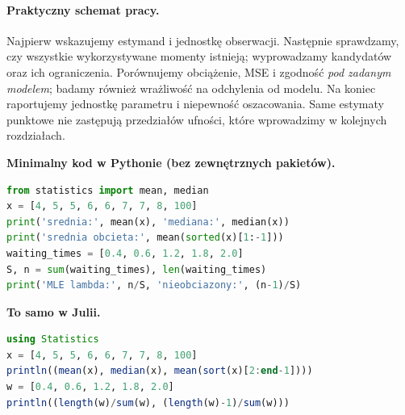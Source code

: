 \paragraph{Praktyczny schemat pracy.}
Najpierw wskazujemy estymand i jednostkę obserwacji. Następnie
sprawdzamy, czy wszystkie wykorzystywane momenty istnieją;
wyprowadzamy kandydatów oraz ich ograniczenia. Porównujemy obciążenie,
MSE i zgodność \emph{pod zadanym modelem}; badamy również wrażliwość
na odchylenia od modelu. Na koniec raportujemy jednostkę parametru
i niepewność oszacowania. Same estymaty punktowe nie zastępują
przedziałów ufności, które wprowadzimy w kolejnych rozdziałach.

\noindent\textbf{Minimalny kod w Pythonie (bez zewnętrznych pakietów).}\par
\par
{}
\smallskip
\begin{lstlisting}[language=Python,caption={Porównanie statystyk odpornych i estymatorów intensywności (Python).}]
from statistics import mean, median
x = [4, 5, 5, 6, 6, 7, 7, 8, 100]
print('srednia:', mean(x), 'mediana:', median(x))
print('srednia obcieta:', mean(sorted(x)[1:-1]))
waiting_times = [0.4, 0.6, 1.2, 1.8, 2.0]
S, n = sum(waiting_times), len(waiting_times)
print('MLE lambda:', n/S, 'nieobciazony:', (n-1)/S)
\end{lstlisting}
\noindent\textbf{To samo w Julii.}\par
\par
{}
\smallskip
\begin{lstlisting}[language=Julia,caption={Średnia obcięta i estymatory intensywności (Julia).}]
using Statistics
x = [4, 5, 5, 6, 6, 7, 7, 8, 100]
println((mean(x), median(x), mean(sort(x)[2:end-1])))
w = [0.4, 0.6, 1.2, 1.8, 2.0]
println((length(w)/sum(w), (length(w)-1)/sum(w)))
\end{lstlisting}


